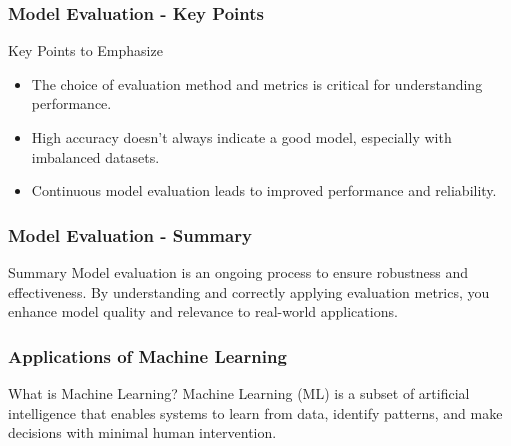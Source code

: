 \documentclass[aspectratio=169]{beamer}
\begin{document}
\begin{frame}[fragile]
    \frametitle{Model Evaluation - Key Points}
    \begin{block}{Key Points to Emphasize}
        \begin{itemize}
            \item The choice of evaluation method and metrics is critical for understanding performance.
            \item High accuracy doesn’t always indicate a good model, especially with imbalanced datasets.
            \item Continuous model evaluation leads to improved performance and reliability.
        \end{itemize}
    \end{block}
\end{frame}

\begin{frame}[fragile]
    \frametitle{Model Evaluation - Summary}
    \begin{block}{Summary}
        Model evaluation is an ongoing process to ensure robustness and effectiveness. 
        By understanding and correctly applying evaluation metrics, you enhance model quality and relevance to real-world applications.
    \end{block}
\end{frame}

\begin{frame}[fragile]
    \frametitle{Applications of Machine Learning}
    \begin{block}{What is Machine Learning?}
        Machine Learning (ML) is a subset of artificial intelligence that enables systems to learn from data, identify patterns, and make decisions with minimal human intervention.
    \end{block}
\end{frame}
\end{document}
